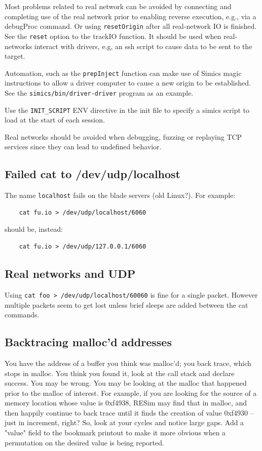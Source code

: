 \documentclass[titlepage]{article}
\begin{document}
\begin{appendices}
Most problems related to real network can be avoided by connecting and completing use of the real network prior to enabling reverse execution, e.g., via a debugProc command.  Or using
{\tt resetOrigin} after all real-network IO is finished.  See the {\tt reset} option to the trackIO function.  It should be used when real-networks interact with drivers, e.g, an ssh
script to cause data to be sent to the target.

Automation, such as the {\tt prepInject} function can make use of Simics magic instructions to allow a driver computer to cause a new origin
to be established.  See the {\tt simics/bin/driver-driver} program as an example.

Use the {\tt INIT\_SCRIPT} ENV directive in the init file to specify a simics script to load at the start of each session.

Real networks should be avoided when debugging, fuzzing or replaying TCP services since they can lead to undefined behavior.

\subsection{Failed cat to /dev/udp/localhost}
The name {\tt localhost} fails on the blade servers (old Linux?).   For example:
\begin{verbatim}
    cat fu.io > /dev/udp/localhost/6060
\end{verbatim}
\noindent should be, instead:
\begin{verbatim}
    cat fu.io > /dev/udp/127.0.0.1/6060
\end{verbatim}

\subsection{Real networks and UDP}
Using {\tt cat foo > /dev/udp/localhost/60060} is fine for a single packet.  However multiple packets seem to get lost unless brief sleeps are
added between the cat commands.

\subsection{Backtracing malloc'd addresses}
You have the address of a buffer you think was malloc'd; you back trace, which stops in malloc.  You think you found it, look at the call stack and
declare success.  You may be wrong.  You may be looking at the malloc that happened prior to the malloc of interest.  For example, if you are looking
for the source of a memory location whose value is 0xf4938, RESim may find that in malloc, and then happily continue to back trace until it finds
the creation of value 0xf4930  -- just in increment, right?  So, look at your cycles and notice large gaps.
Add a "value" field to the bookmark printout to make it more obvious when a permutation on the desired value is being reported.


\end{appendices}
\end{document}
